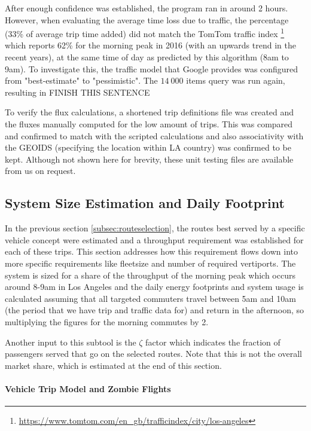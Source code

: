 After enough confidence was established, the program ran in around 2 hours. However, when evaluating the average time loss due to traffic, the percentage (33\% of average trip time added) did not match the TomTom traffic index \footnote{\url{https://www.tomtom.com/en_gb/trafficindex/city/los-angeles}} which reports 62\% for the morning peak in 2016 (with an upwards trend in the recent years), at the same time of day as predicted by this algorithm (8am to 9am). To investigate this, the traffic model that Google provides was configured from "best-estimate" to "pessimistic". The $14\ 000$ items query was run again, resulting in FINISH THIS SENTENCE

To verify the flux calculations, a shortened trip definitions file was created and the fluxes manually computed for the low amount of trips. This was compared and confirmed to match with the scripted calculations and also associativity with the GEOIDS (specifying the location within LA country) was confirmed to be kept. Although not shown here for brevity, these unit testing files are available from us on request.
\fi



\subsection{System Size Estimation and Daily Footprint}

In the previous section \ref{subsec:routeselection}, the routes best served by a specific vehicle concept were estimated and a throughput requirement was established for each of these trips. This section addresses how this requirement flows down into more specific requirements like fleetsize and number of required vertiports. The system is sized for a share of the throughput of the morning peak which occurs around 8-9am in Los Angeles and the daily energy footprints and system usage is calculated assuming that all targeted commuters travel between 5am and 10am (the period that we have trip and traffic data for) and return in the afternoon, so multiplying the figures for the morning commutes by 2.

Another input to this subtool is the $\zeta$ factor which indicates the fraction of passengers served that go on the selected routes. Note that this is not the overall market share, which is estimated at the end of this section.


\paragraph{Vehicle Trip Model and Zombie Flights}

